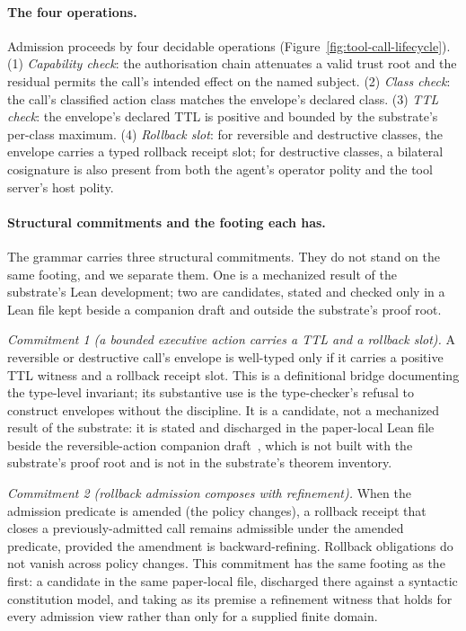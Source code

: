 \paragraph{The four operations.}
Admission proceeds by four decidable operations (Figure~\ref{fig:tool-call-lifecycle}). (1) \emph{Capability check}: the authorisation chain attenuates a valid trust root and the residual permits the call's intended effect on the named subject. (2) \emph{Class check}: the call's classified action class matches the envelope's declared class. (3) \emph{TTL check}: the envelope's declared TTL is positive and bounded by the substrate's per-class maximum. (4) \emph{Rollback slot}: for reversible and destructive classes, the envelope carries a typed rollback receipt slot; for destructive classes, a bilateral cosignature is also present from both the agent's operator polity and the tool server's host polity.

\paragraph{Structural commitments and the footing each has.}
The grammar carries three structural commitments. They do not stand on the same footing, and we separate them. One is a mechanized result of the substrate's Lean development; two are candidates, stated and checked only in a Lean file kept beside a companion draft and outside the substrate's proof root.

\emph{Commitment 1 (a bounded executive action carries a TTL and a rollback slot).} A reversible or destructive call's envelope is well-typed only if it carries a positive TTL witness and a rollback receipt slot. This is a definitional bridge documenting the type-level invariant; its substantive use is the type-checker's refusal to construct envelopes without the discipline. It is a candidate, not a mechanized result of the substrate: it is stated and discharged in the paper-local Lean file beside the reversible-action companion draft~\cite{reversibleAction2026}, which is not built with the substrate's proof root and is not in the substrate's theorem inventory.

\emph{Commitment 2 (rollback admission composes with refinement).} When the admission predicate is amended (the policy changes), a rollback receipt that closes a previously-admitted call remains admissible under the amended predicate, provided the amendment is backward-refining. Rollback obligations do not vanish across policy changes. This commitment has the same footing as the first: a candidate in the same paper-local file, discharged there against a syntactic constitution model, and taking as its premise a refinement witness that holds for every admission view rather than only for a supplied finite domain.

